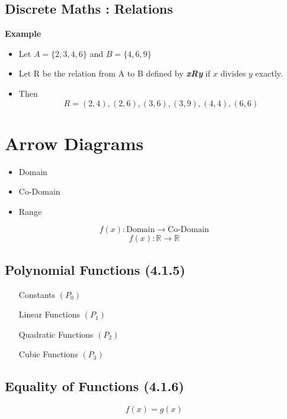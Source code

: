 \documentclass[]{report}
\begin{document}

\subsection{Discrete Maths : Relations}

\textbf{Example}
\begin{itemize}

\item Let $A = \{2, 3, 4, 6\}$ and $B = \{4, 6, 9\}$
\item Let R be the relation from A to B defined by \textit{\textbf{xRy}} if $x$
divides $y$ exactly.
\item  Then
\[R = {(2, 4), (2, 6), (3, 6), (3, 9), (4, 4), (6, 6)}\]
\end{itemize}



\section{Arrow Diagrams}

\begin{itemize}

\item Domain
\item Co-Domain
\item Range
\end{itemize}
\[  f(x) : \mbox{Domain} \rightarrow \mbox{Co-Domain} \]
\[  f(x) : \mathbb{R} \rightarrow \mathbb{R} \]
\newpage
\subsection*{Polynomial Functions (4.1.5)}

\begin{itemize}
\item[Constants] $(P_0)$
\item[Linear Functions] $(P_1)$
\item[Quadratic Functions] $(P_2)$
\item[Cubic Functions] $(P_3)$
\end{itemize}


\subsection*{Equality of Functions (4.1.6)}
\[f(x) = g(x) \]
\end{document}
